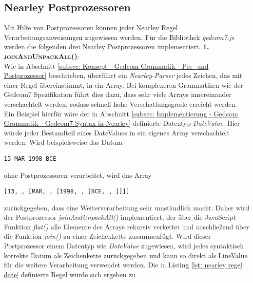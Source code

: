 \subsection{Nearley Postprozessoren}
\label{subsec: Implementierung - Gedcom Grammatik - Nearley Postprozessoren}
 Mit Hilfe von Postprozessoren können jeder Nearley Regel Verarbeitungsanweisungen zugewiesen werden. Für die Bibliothek \textit{gedcom7.js} werden die folgenden drei Nearley Postprozessoren implementiert.
\newpage
\textsc{\textbf{1. joinAndUnpackAll()}:} \vspace{0.5em} \\
Wie in Abschnitt \ref{subsec: Konzept - Gedcom Grammatik - Pre- und Postprozessor} beschrieben, überführt ein \textit{Nearley-Parser} jedes Zeichen, das mit einer Regel übereinstimmt, in ein Array. Bei komplexeren Grammatiken wie der Gedcom7 Spezifikation führt dies dazu, dass sehr viele Arrays innereinander verschachtelt werden, sodass schnell hohe Verschatlungsgrade erreicht werden. Ein Beispiel hierfür wäre der in Abschnitt \ref{subsec: Implementierung - Gedcom Grammatik - Gedcom7 Syntax in Nearley} definierte Datentyp \textit{DateValue}. Hier würde jeder Bestandteil eines DateValues in ein eigenes Array verschachtelt werden. Wird beispielsweise das Datum 
\begin{lstlisting}[frame=none]
			 	13 MAR 1998 BCE
\end{lstlisting}
ohne Postprozessoren verarbeitet, wird das Array
\begin{lstlisting}[frame=none]
		[13, , [MAR, , [1998, , [BCE, , ]]]]
\end{lstlisting}
zurückgegeben, dass eine Weiterverarbeitung sehr umständlich macht. Daher wird der Postprozessor \textit{joinAndUnpackAll()} implementiert, der über die JavaScript Funktion \textit{flat()} alle Elemente des Arrays rekursiv verkettet und anschließend über die Funktion \textit{join()} zu einer Zeichenkette zusammenfügt. Wird dieser Postprozessor einem Datentyp wie \textit{DateValue} zugewiesen, wird jedes syntaktisch korrekte Datum als Zeichenkette zurückgegeben und kann so direkt als LineValue für die weitere Verarbeitung verwendet werden. Die in Listing \ref{lst: nearley regel date} definierte Regel würde sich ergeben zu
\vspace{1em}
\vspace{1em}

